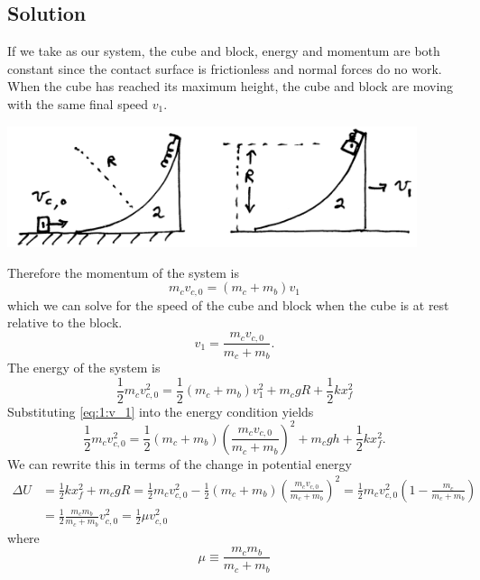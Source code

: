 \documentclass[solutions]{esg8012exam}
\begin{document}
\subsection{Solution}
  If we take as our system, the cube and block, energy and momentum are both constant since the contact surface is frictionless and normal forces do no work. When the cube has reached its maximum height, the cube and block are moving with the same final speed $v_1$.
  \begin{center}\includegraphics[width=0.9\textwidth]{exam2_s1_1}\end{center}
  Therefore the momentum of the system is
  \begin{equation} m_c v_{c,0} = (m_c + m_b) v_1 \label{eq:1:system_momentum} \end{equation}
  which we can solve for the speed of the cube and block when the cube is at rest relative to the block.
  \begin{equation} v_1 =  \frac{m_c v_{c, 0}}{m_c + m_b}. \label{eq:1:v_1} \end{equation}
  The energy of the system is
  \begin{equation} \frac12 m_c v_{c,0}^2 = \frac12 (m_c + m_b)v_1^2 + m_c g R + \frac12 k x_f^2 \label{eq:1:system_energy} \end{equation}
  Substituting \autoref{eq:1:v_1} into the energy condition yields
  \begin{equation} \frac12 m_c v_{c,0}^2 = \frac12 (m_c + m_b)\left( \frac{m_c v_{c,0}}{m_c + m_b}\right)^2 + m_c g h + \frac12 k x_f^2. \label{eq:1:system_energy_2} \end{equation}
  We can rewrite this in terms of the change in potential energy
  \begin{align}
    \Delta U & = \frac12 k x_f^2 + m_c g R = \frac12 m_c v_{c,0}^2 - \frac12 (m_c + m_b) \left( \frac{m_c v_{c,0}}{m_c + m_b}\right)^2 = \frac12 m_c v_{c, 0}^2\left( 1 - \frac{m_c}{m_c + m_b}\right) \nonumber \\
    & = \frac12 \frac{m_c m_b}{m_c + m_b} v_{c,0}^2 = \frac12 \mu v_{c,0}^2 \label{eq:1:potential_energy}
  \end{align}
  where
  \begin{equation} \mu \equiv \frac{m_c m_b}{m_c + m_b} \label{eq:1:def_mu} \end{equation}
\end{document}
